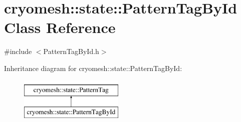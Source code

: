 \hypertarget{classcryomesh_1_1state_1_1PatternTagById}{\section{cryomesh\-:\-:state\-:\-:\-Pattern\-Tag\-By\-Id \-Class \-Reference}
\label{classcryomesh_1_1state_1_1PatternTagById}
}


{\ttfamily \#include $<$\-Pattern\-Tag\-By\-Id.\-h$>$}

\-Inheritance diagram for cryomesh\-:\-:state\-:\-:\-Pattern\-Tag\-By\-Id\-:\begin{figure}[H]
\begin{center}
\leavevmode
\includegraphics[height=2.000000cm]{classcryomesh_1_1state_1_1PatternTagById}
\end{center}
\end{figure}
